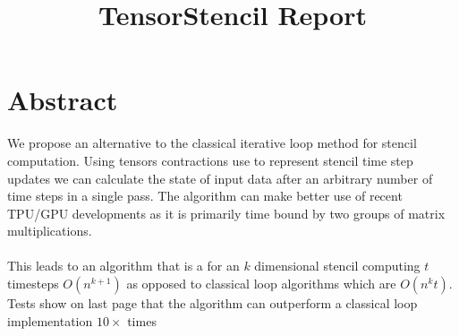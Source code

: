 \documentclass[conference]{IEEEtran}
\begin{document}

\title{TensorStencil Report}

\author{

}

\maketitle





\section{Abstract}
We propose an alternative to the classical iterative loop method for stencil computation. 
Using tensors contractions use to represent stencil time step updates we can calculate the state of input data after an arbitrary number of time steps in a single pass. 
The algorithm can make better use of recent TPU/GPU developments as it is primarily time bound by two groups of matrix multiplications. 
\\ \\ This leads to an algorithm that is a for an $k$ dimensional stencil computing $t$ timesteps $O(n^{k+1})$ as opposed to classical loop algorithms which are $O(n^{k}t)$.
Tests show on last page that the algorithm can outperform a classical loop implementation $10\times$ times
\\
\end{document}
